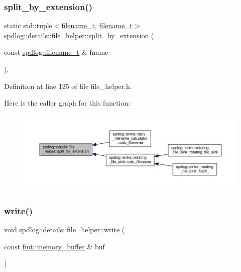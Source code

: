 \subsubsection{\texorpdfstring{split\+\_\+by\+\_\+extension()}{split\_by\_extension()}}
{\footnotesize\ttfamily static std\+::tuple$<$\hyperlink{namespacespdlog_acf7ce125b3622e44f8f1702d699e0b06}{filename\+\_\+t}, \hyperlink{namespacespdlog_acf7ce125b3622e44f8f1702d699e0b06}{filename\+\_\+t}$>$ spdlog\+::details\+::file\+\_\+helper\+::split\+\_\+by\+\_\+extension (\begin{DoxyParamCaption}\item[{const \hyperlink{namespacespdlog_acf7ce125b3622e44f8f1702d699e0b06}{spdlog\+::filename\+\_\+t} \&}]{fname }\end{DoxyParamCaption})\hspace{0.3cm}{\ttfamily [inline]}, {\ttfamily [static]}}



Definition at line 125 of file file\+\_\+helper.\+h.

Here is the caller graph for this function\+:
\nopagebreak
\begin{figure}[H]
\begin{center}
\leavevmode
\includegraphics[width=350pt]{classspdlog_1_1details_1_1file__helper_a28d87e3f42c52a12c95af0558aca66f2_icgraph}
\end{center}
\end{figure}
\mbox{\label{classspdlog_1_1details_1_1file__helper_a51eb58a2d46f1896f3ab7b9d323d97ae}} 
\subsubsection{\texorpdfstring{write()}{write()}}
{\footnotesize\ttfamily void spdlog\+::details\+::file\+\_\+helper\+::write (\begin{DoxyParamCaption}\item[{const \hyperlink{format_8h_a21cbf729f69302f578e6db21c5e9e0d2}{fmt\+::memory\+\_\+buffer} \&}]{buf }\end{DoxyParamCaption})\hspace{0.3cm}{\ttfamily [inline]}}



